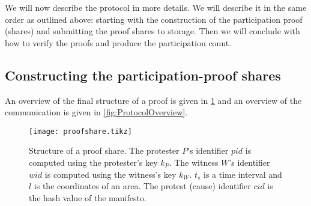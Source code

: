 We will now describe the protocol in more details.
We will describe it in the same order as outlined above:
starting with the construction of the participation proof (shares) and 
submitting the proof shares to storage.
Then we will conclude with how to verify the proofs and produce the 
participation count.

\subsection{Constructing the participation-proof shares}

An overview of the final structure of a proof is given in \cref{fig:ProofFig} 
and an overview of the communication is given in \cref{fig:ProtocolOverview}.

\begin{figure}
  \centering
  \texttt{[image: proofshare.tikz]}
  \caption{%
    Structure of a proof share.
    The protester \(P\)'s identifier \(pid\) is computed using the protester's 
    key \(k_P\).
    The witness \(W\)'s identifier \(wid\) is computed using the witness's key 
    \(k_W\).
    \(t_s\) is a time interval and \(l\) is the coordinates of an area.
    The protest (cause) identifier \(cid\) is the hash value of the manifesto.
  }%
  \label{fig:ProofFig}
\end{figure}%

